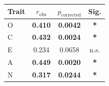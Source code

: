 \begin{tabular}{lccc}
\toprule
Trait & $r_{\mathrm{obs}}$ & $p_{\mathrm{corrected}}$ & Sig. \\
\midrule
O & \textbf{0.410} & \textbf{0.0042} & \textbf{*} \\
C & \textbf{0.432} & \textbf{0.0024} & \textbf{*} \\
E & 0.234 & 0.0658 & n.s. \\
A & \textbf{0.449} & \textbf{0.0020} & \textbf{*} \\
N & \textbf{0.317} & \textbf{0.0244} & \textbf{*} \\
\bottomrule
\end{tabular}
